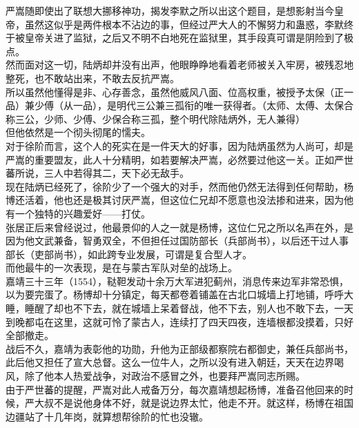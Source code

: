 \begin{multicols}{\theparacolNo}
严嵩随即使出了联想大挪移神功，揭发李默之所以出这个题目，是想影射当今皇帝，虽然这似乎是两件根本不沾边的事，但经过严大人的不懈努力和蛊惑，李默终于被皇帝关进了监狱，之后又不明不白地死在监狱里，其手段真可谓是阴险到了极点。\\

然而面对这一切，陆炳却并没有出声，他眼睁睁地看着老师被关入牢房，被残忍地整死，也不敢站出来，不敢去反抗严嵩。\\

所以虽然他懂得是非、心存善念，虽然他威风八面、位高权重，被授予太保（正一品）兼少傅（从一品），是明代三公兼三孤衔的唯一获得者。（太师、太傅、太保合称三公，少师、少傅、少保合称三孤，整个明代除陆炳外，无人兼得）\\

但他依然是一个彻头彻尾的懦夫。\\

对于徐阶而言，这个人的死实在是一件天大的好事，因为陆炳虽然为人尚可，却是严嵩的重要盟友，此人十分精明，如若要解决严嵩，必然要过他这一关。正如严世蕃所说，三人中若得其二，天下必无敌手。\\

现在陆炳已经死了，徐阶少了一个强大的对手，然而他仍然无法得到任何帮助，杨博还活着，他也还是极其讨厌严嵩，但这位仁兄却不愿意也没法掺和进来，因为他有一个独特的兴趣爱好——打仗。\\

张居正后来曾经说过，他最景仰的人之一就是杨博，这位仁兄之所以名声在外，是因为他文武兼备，智勇双全，不但担任过国防部长（兵部尚书），以后还干过人事部长（吏部尚书），如此跨专业发展，可谓是复合型人才。\\

而他最牛的一次表现，是在与蒙古军队对垒的战场上。\\

嘉靖三十三年（1554），鞑靼发动十余万大军进犯蓟州，消息传来边军非常恐惧，以为要完蛋了。杨博却十分镇定，每天都卷着铺盖在古北口城墙上打地铺，呼呼大睡，睡醒了却也不下去，就在城墙上呆着督战，他不下去，别人也不敢下去，一天到晚都屯在这里，这就可怜了蒙古人，连续打了四天四夜，连墙根都没摸着，只好全部撤走。\\

战后不久，嘉靖为表彰他的功勋，升他为正部级都察院右都御史，兼任兵部尚书，此后他又担任了宣大总督。这么一位牛人，之所以没有进入朝廷，天天在边界喝风，除了他本人热爱战争，对政治不感冒之外，也要拜严嵩同志所赐。\\

由于严世蕃的提醒，严嵩对此人戒备万分，每次嘉靖想起杨博，准备召他回来的时候，严大叔不是说他身体不好，就是说边界太忙，他走不开。就这样，杨博在祖国边疆站了十几年岗，就算想帮徐阶的忙也没辙。\\


\end{multicols}
